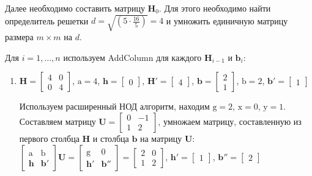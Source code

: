 Далее необходимо составить матрицу $ \mathbf{H}_0 $. Для этого необходимо найти определитель решетки $ d = \sqrt{(5 \cdot \frac{16}{5})} = 4 $ и умножить единичную матрицу размера $ m \times m $ на $ d $. 

Для $ i = 1, \ldots, n $ используем AddColumn для каждого $ \mathbf{H}_{i - 1} $ и $ \mathbf{b}_i $:
\begin{enumerate}

\item $ \mathbf{H} = \left[\begin{array}{cccc}
4 & 0 \\
0 & 4
\end{array}\right] $, $ \mathrm{a} = 4 $, $ \mathbf{h} = \left[\begin{array}{cccc}
0 
\end{array}\right] $, $ \mathbf{H}' = \left[ \begin{array}{cccc}
4
\end{array}\right] $, $ \mathbf{b} = \left[\begin{array}{cccc}
2 \\
1
\end{array}\right] $, $ \mathrm{b} = 2 $, $ \mathbf{b}' = \left[ \begin{array}{cccc}
1
\end{array}\right] $

Используем расширенный НОД алгоритм, находим $ \mathrm{g} = 2 $, $ \mathrm{x} = 0 $, $ \mathrm{y} = 1 $. Составляем матрицу $  \mathbf{U} = \left[\begin{array}{cccc}
0 & -1 \\
1 & 2
\end{array}\right] $, умножаем матрицу, составленную из первого столбца $ \mathbf{H} $ и столбца $ \mathbf{b} $ на матрицу $ \mathbf{U} $: $ \left[ \begin{array}{cccc}
\mathrm{a} & \mathrm{b} \\
\mathbf{h} & \mathbf{b}' \end{array} \right] \mathbf{U}=
\left[ \begin{array}{cccc}
\mathrm{g} & \mathrm{0} \\
\mathbf{h}' & \mathbf{b}'' \end{array} \right] = \left[\begin{array}{cccc}
2 & 0 \\
1 & 2
\end{array}\right] $, $ \mathbf{h}' = \left[\begin{array}{cccc}
1
\end{array}\right] $, $ \mathbf{b}'' = \left[\begin{array}{cccc}
2
\end{array}\right] $


\end{enumerate}
